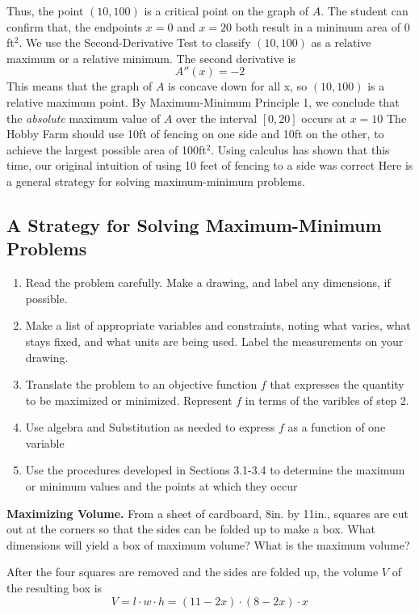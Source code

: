 \documentclass{report}
\begin{document}
\pagebreak
\noindent Thus, the point $(10,100)$ is a critical point on the graph of $A$. The student can confirm that, the endpoints $x=0$ and $x=20$ both result in a minimum area of $0$ft$^2$. We use the Second-Derivative Test to classify $(10,100)$ as a relative maximum or a relative minimum. The second derivative is
$$ A''(x) = -2$$
This means that the graph of $A$ is concave down for all x, so $(10,100)$ is a relative maximum point. By Maximum-Minimum Principle 1, we conclude that the \textit{absolute} maximum value of $A$ over the interval $[0,20]$ occurs at $x = 10$
\bigbreak \noindent
The Hobby Farm should use 10ft of fencing on one side and 10ft on the other, to achieve the largest possible area of 100ft$^2$. Using calculus has shown that this time, our original intuition of using 10 feet of fencing to a side was correct
\bigbreak \noindent \bigbreak \noindent
Here is a general strategy for solving maximum-minimum problems.
\bigbreak \noindent
\begin{mdframed}
  \subsection*{A Strategy for Solving Maximum-Minimum Problems}
  \begin{enumerate}
    \item Read the problem carefully. Make a drawing, and label any dimensions, if possible. 
    \item Make a list of appropriate variables and constraints, noting what varies, what stays fixed, and what units are being used. Label the measurements on your drawing.
      \item Translate the problem to an objective function $f$ that expresses the quantity to be maximized or minimized. Represent $f$ in terms of the varibles of step 2.
      \item Use algebra and Substitution as needed to express $f$ as a function of one variable
      \item Use the procedures developed in Sections 3.1-3.4 to determine the maximum or minimum values and the points at which they occur
  \end{enumerate}
\end{mdframed}
\bigbreak \noindent \bigbreak \noindent
\textbf{Maximizing Volume.} From a sheet of cardboard, 8in. by 11in., squares are cut out at the corners so that the sides can be folded up to make a box. What dimensions will yield a box of maximum volume? What is the maximum volume?
\bigbreak \noindent
\begin{minipage}{0.5\textwidth}
\end{minipage}
\begin{minipage}{0.5\textwidth}
\end{minipage}
\bigbreak \noindent
After the four squares are removed and the sides are folded up, the volume $V$ of the resulting box is
$$ V = l \cdot w \cdot h = (11-2x) \cdot (8-2x) \cdot x$$
\end{document}
